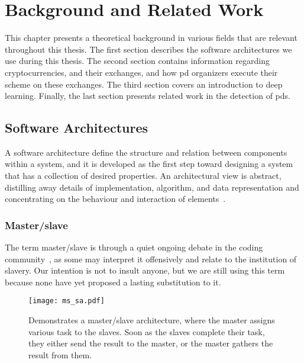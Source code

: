 
\chapter{Background and Related Work}\label{ch:background}\glsresetall
This chapter presents a theoretical background in various fields that are relevant throughout this thesis. The first section describes the software architectures we use during this thesis. The second section contains information regarding cryptocurrencies, and their exchanges, and how  \ac{pd} organizers execute their scheme on these exchanges. The third section covers an introduction to deep learning. Finally, the last section presents related work in the detection of \acp{pd}.

\section{Software Architectures}
A software architecture define the structure and relation between components within a system, and it is developed as the first step toward designing a system that has a collection of desired properties. An architectural view is abstract, distilling away details of implementation, algorithm, and data representation and concentrating on the behaviour and interaction of elements~\cite[p.~3]{bass2003software}.

\subsection{Master/slave}\label{sec:master_slave}
The term master/slave is through a quiet ongoing debate in the coding community~\cite{giz_master, reg_master, med_master}, as some may interpret it offensively and relate to the institution of slavery. Our intention is not to insult anyone, but we are still using this term because none have yet proposed a lasting substitution to it.

\begin{figure}[ht]
    \centering
    \texttt{[image: ms\_sa.pdf]}
    \caption[Architecture - master/slave]{Demonstrates a master/slave architecture, where the master assigns various task to the slaves. Soon as the slaves complete their task, they either send the result to the master, or the master gathers the result from them.}
    \label{fig:msa}
\end{figure}

